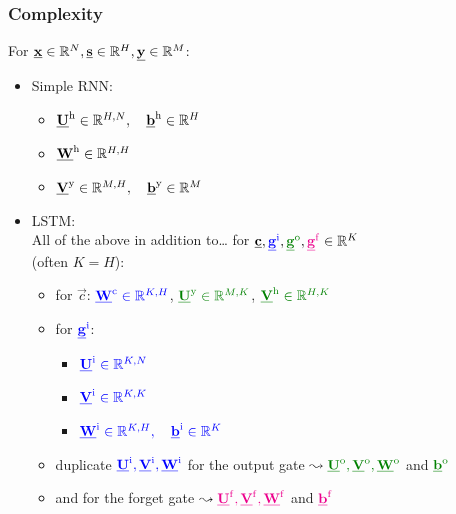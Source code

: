 \begin{frame}\frametitle{Complexity}
		For $\vec x \in \R^N, \vec s \in \R^H, \vec y \in \R^M$:\\
		\begin{itemize}
		\item[]
			Simple RNN:\\
			\begin{itemize}
			\item $\vec U^{\mathrm{h}} \in \R^{H,N},\quad \vec b^{\mathrm{h}} \in \R^{H}$
			\item $\vec W^{\mathrm{h}} \in \R^{H,H}$
			\item $\vec V^{\mathrm{y}} \in \R^{M,H},\quad \vec b^{\mathrm{y}} \in \R^{M}$
			\end{itemize}
			\pause
			
		\item[]
			LSTM:\\
			All of the above in addition to\ldots
			for $\vec c, {\color{blue}\vec g^{\mathrm{i}}}, {\color{darkgreen}\vec g^{\mathrm{o}}}, {\color{magenta}\vec g^{\mathrm{f}}} \in \R^K$\\
			(often $K=H$):\\
			\pause
			\begin{itemize}
			\item for $\vec c$:
             $\color{blue}\vec W^{\mathrm{c}} \in \R^{K,H}$, 
			 $\color{darkgreen}\vec U^{\mathrm{y}} \in \R^{M,K}$,
			 $\color{darkgreen}\vec V^{\mathrm{h}} \in \R^{H,K}$
			\item[] for ${\color{blue}\vec g^{\mathrm{i}}}$:
            \begin{itemize}
                \item $\color{blue}\vec U^{\mathrm{i}} \in \R^{K,N}$
                \item $\color{blue}\vec V^{\mathrm{i}} \in \R^{K,K}$
                \item $\color{blue}\vec W^{\mathrm{i}} \in \R^{K,H}, \quad \vec b^{\mathrm{i}} \in \R^{K}$
			\end{itemize}
            \item duplicate $\color{blue}\vec U^{\mathrm{i}}, \color{blue}\vec V^{\mathrm{i}}, \color{blue}\vec W^{\mathrm{i}}$
			for the output gate $\leadsto \color{darkgreen}\vec U^{\mathrm{o}}, \color{darkgreen}\vec V^{\mathrm{o}}, \color{darkgreen}\vec W^{\mathrm{o}}$ and $\color{darkgreen}\vec b^{\mathrm{o}}$
			\item and for the forget gate $\leadsto \color{magenta}\vec U^{\mathrm{f}}, \color{magenta}\vec V^{\mathrm{f}}, \color{magenta}\vec W^{\mathrm{f}}$ and $\color{magenta}\vec b^{\mathrm{f}}$
			\end{itemize}
		\end{itemize}
        
        \pause

\end{frame}
